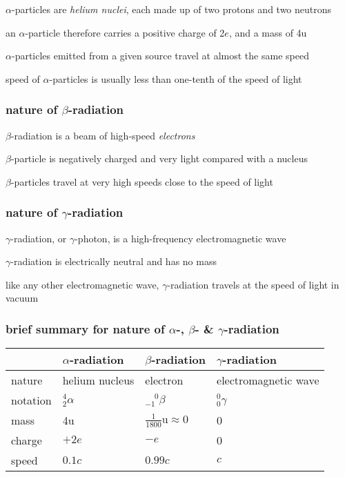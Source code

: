 $\alpha$-particles are \emph{helium nuclei}, each made up of two protons and two neutrons

an $\alpha$-particle therefore carries a positive charge of 2$e$, and a mass of 4u

$\alpha$-particles emitted from a given source travel at almost the same speed

speed of $\alpha$-particles is usually less than one-tenth of the speed of light

\subsubsection*{nature of \texorpdfstring{$\beta$}{\textbeta}-radiation}


$\beta$-radiation is a beam of high-speed \emph{electrons}

$\beta$-particle is negatively charged and very light compared with a nucleus

$\beta$-particles travel at very high speeds close to the speed of light

\subsubsection*{nature of \texorpdfstring{$\gamma$}{\textgamma}-radiation}

$\gamma$-radiation, or $\gamma$-photon, is a high-frequency electromagnetic wave

$\gamma$-radiation is electrically neutral and has no mass

like any other electromagnetic wave, $\gamma$-radiation travels at the speed of light in vacuum

\subsubsection*{brief summary for nature of \texorpdfstring{$\alpha$}{\textalpha}-, \texorpdfstring{$\beta$}{\textbeta}- \& \texorpdfstring{$\gamma$}{\textgamma}-radiation}



\begin{center}
	{\renewcommand{\arraystretch}{1.2}
	\begin{tabular}{|C{2cm}|C{2.8cm}|C{2.8cm}|C{4.2cm}|}
	\hline  & $\alpha$-radiation & $\beta$-radiation & $\gamma$-radiation \\ 
	\hline nature & helium nucleus & electron & electromagnetic wave \\ 
	\hline notation & $^4_2\alpha$ & $^{\phantom{-}0}_{-1}\beta$ & $^0_0\gamma$ \\
	\hline mass & 4u & $\frac{1}{1800}\text{u} \approx 0$ & 0 \\[4pt]
	\hline charge & $+2e$ & $-e$ & 0 \\ 
	\hline speed & $0.1c$ & $0.99c$ & $c$ \\
	\hline
    \end{tabular}
    }
\end{center}


